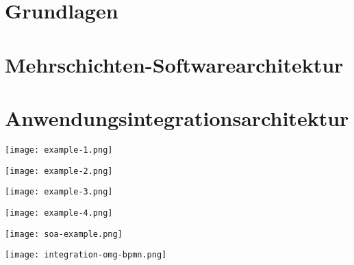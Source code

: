 





\newcommand{\TITLE}{Test Cheat Sheet}
\newcommand{\DELIVERYDATE}{22.02.2021}


    \setlength{\columnseprule}{0.4pt}
    \footnotesize
    \begin{multicols*}{4}
        \setlength{\columnseprule}{0.4pt}
        \section{Grundlagen}
        
        \vfill\null
        \columnbreak
        
        \newpage
        \section{Mehrschichten-Softwarearchitektur}
        
        \vfill\null
        \columnbreak
        
        \vfill\null
        \columnbreak
        
        \vfill\null
        \columnbreak
        
        \newpage
        \section{Anwendungsintegrationsarchitektur}
        
        \vfill\null
        \columnbreak
        
        \vfill\null
        \columnbreak
        
        \vfill\null
        \columnbreak
        


    \end{multicols*}

    \begin{multicols*}{2}
        \setlength{\columnseprule}{0.4pt}

        \texttt{[image: example-1.png]}

        \texttt{[image: example-2.png]}

        \texttt{[image: example-3.png]}

        \texttt{[image: example-4.png]}

        \texttt{[image: soa-example.png]}

        \texttt{[image: integration-omg-bpmn.png]}
    \end{multicols*}


